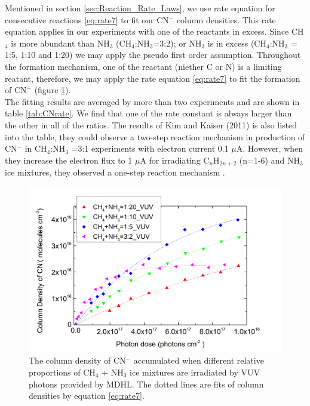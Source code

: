Mentioned in section \ref{sec:Reaction_Rate_Laws}, we use rate equation for consecutive reactions \ref{eq:rate7} to fit our CN$^-$ column densities. This rate equation applies in our experiments with one of the reactants in excess. Since CH$_4$ is more abundant than NH$_3$ (CH$_4$:NH$_3$=3:2); or NH$_3$ is in excess (CH$_4$:NH$_3$ = 1:5, 1:10 and 1:20) we may apply the pseudo first order assumption. Throughout the formation mechanism, one of the reactant (niether C or N) is a limiting reatant, therefore, we may apply the rate equation \ref{eq:rate7} to fit the formation of CN$^-$ (figure \ref{fig:CNrate}).\\

The fitting results are averaged by more than two experiments and are shown in table \ref{tab:CNrate}. We find that one of the rate constant is always larger than the other in all of the ratios. The results of Kim and Kaiser (2011) is also listed into the table, they could observe a two-step reaction mechanism in production of CN$^-$ in CH$_4$:NH$_3$ =3:1 experiments with electron current 0.1 $\mu$A. However, when they increase the electron flux to 1 $\mu$A for irradiating C$_n$H$_{2n+2}$ (n=1-6) and NH$_3$ ice mixtures, they observed a one-step reaction mechanism \cite{kim}.\\

\begin{figure}
\centering
\includegraphics[width=\textwidth]{figures/chapter3/CN_rate_VUV.png}
\caption{The column density of CN$^-$ accumulated when different relative proportions of CH$_4$ + NH$_3$ ice mixtures are irradiated by VUV photons provided by MDHL. The dotted lines are fits of column densities by equation \ref{eq:rate7}.}
\label{fig:CNrate}
\end{figure}

